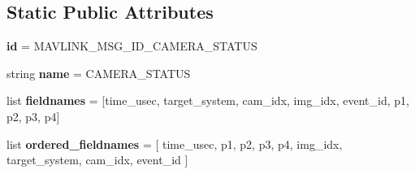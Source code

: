 \subsection*{Static Public Attributes}
\begin{DoxyCompactItemize}
\item 
\mbox{\label{classpymavlink_1_1dialects_1_1v10_1_1MAVLink__camera__status__message_a6093c438cf54e075635189d70cd3061f}} 
{\bfseries id} = M\+A\+V\+L\+I\+N\+K\+\_\+\+M\+S\+G\+\_\+\+I\+D\+\_\+\+C\+A\+M\+E\+R\+A\+\_\+\+S\+T\+A\+T\+US
\item 
\mbox{\label{classpymavlink_1_1dialects_1_1v10_1_1MAVLink__camera__status__message_a699b48875e06cfbdc91dae01a9313aa7}} 
string {\bfseries name} = \textquotesingle{}C\+A\+M\+E\+R\+A\+\_\+\+S\+T\+A\+T\+US\textquotesingle{}
\item 
\mbox{\label{classpymavlink_1_1dialects_1_1v10_1_1MAVLink__camera__status__message_ab5514b8bcf5dcd5cb418da68319d0f94}} 
list {\bfseries fieldnames} = \mbox{[}\textquotesingle{}time\+\_\+usec\textquotesingle{}, \textquotesingle{}target\+\_\+system\textquotesingle{}, \textquotesingle{}cam\+\_\+idx\textquotesingle{}, \textquotesingle{}img\+\_\+idx\textquotesingle{}, \textquotesingle{}event\+\_\+id\textquotesingle{}, \textquotesingle{}p1\textquotesingle{}, \textquotesingle{}p2\textquotesingle{}, \textquotesingle{}p3\textquotesingle{}, \textquotesingle{}p4\textquotesingle{}\mbox{]}
\item 
\mbox{\label{classpymavlink_1_1dialects_1_1v10_1_1MAVLink__camera__status__message_a94f809c1a05553656b34a3d147111ec9}} 
list {\bfseries ordered\+\_\+fieldnames} = \mbox{[} \textquotesingle{}time\+\_\+usec\textquotesingle{}, \textquotesingle{}p1\textquotesingle{}, \textquotesingle{}p2\textquotesingle{}, \textquotesingle{}p3\textquotesingle{}, \textquotesingle{}p4\textquotesingle{}, \textquotesingle{}img\+\_\+idx\textquotesingle{}, \textquotesingle{}target\+\_\+system\textquotesingle{}, \textquotesingle{}cam\+\_\+idx\textquotesingle{}, \textquotesingle{}event\+\_\+id\textquotesingle{} \mbox{]}
\item 

\end{DoxyCompactItemize}
